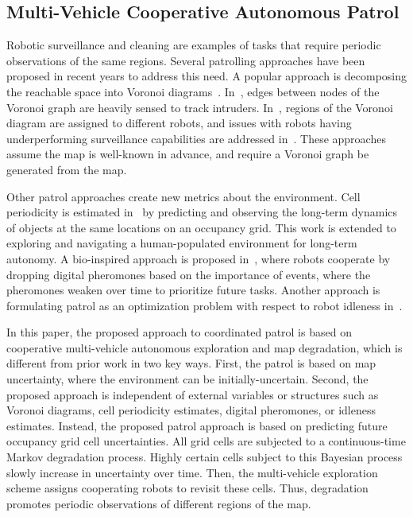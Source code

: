 \documentclass[smallextended]{svjour3}       %
\begin{document}
\subsection{Multi-Vehicle Cooperative Autonomous Patrol}

Robotic surveillance and cleaning are examples of tasks that require periodic observations of the same regions. Several patrolling approaches have been proposed in recent years to address this need. A popular approach is decomposing the reachable space into Voronoi diagrams~\cite{KolCar08,PorRoc10,PipChrWei13}. In~\cite{KolCar08}, edges between nodes of the Voronoi graph are heavily sensed to track intruders. In~\cite{PorRoc10}, regions of the Voronoi diagram are assigned to different robots, and issues with robots having underperforming surveillance capabilities are addressed in~\cite{PipChrWei13}. These approaches assume the map is well-known in advance, and require a Voronoi graph be generated from the map.

Other patrol approaches create new metrics about the environment. Cell periodicity is estimated in~\cite{KraFenCieDonDuc14,KraFenHanDuc16} by predicting and observing the long-term dynamics of objects at the same locations on an occupancy grid. This work is extended to exploring and navigating a human-populated environment for long-term autonomy. A bio-inspired approach is proposed in~\cite{ZhaXia11}, where robots cooperate by dropping digital pheromones based on the importance of events, where the pheromones weaken over time to prioritize future tasks. Another approach is formulating patrol as an optimization problem with respect to robot idleness in~\cite{YanZha16}.

In this paper, the proposed approach to coordinated patrol is based on cooperative multi-vehicle autonomous exploration and map degradation, which is different from prior work in two key ways. First, the patrol is based on map uncertainty, where the environment can be initially-uncertain. Second, the proposed approach is independent of external variables or structures such as Voronoi diagrams, cell periodicity estimates, digital pheromones, or idleness estimates. Instead, the proposed patrol approach is based on predicting future occupancy grid cell uncertainties. All grid cells are subjected to a continuous-time Markov degradation process. Highly certain cells subject to this Bayesian process slowly increase in uncertainty over time. Then, the multi-vehicle exploration scheme assigns cooperating robots to revisit these cells. Thus, degradation promotes periodic observations of different regions of the map.
\end{document}
